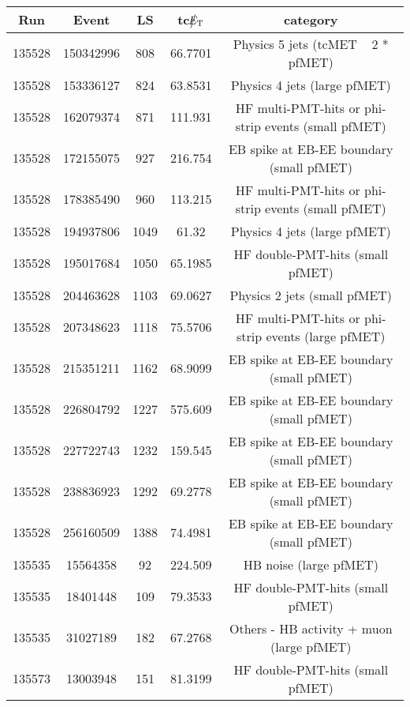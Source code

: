 \begin{table}[htbp]
  \begin{center}
    \begin{tabular}{|c|c|c|c|c|}
      \hline
      Run & Event & LS & tc$\big\slash\hspace{-1.6ex}{E_\text{T}}$ & category \\     
      \hline
      135528  & 150342996    & 808  &    66.7701 & Physics 5 jets (tcMET ~ 2 * pfMET) \\
      135528  & 153336127    & 824  &    63.8531 & Physics 4 jets (large pfMET) \\
      135528  & 162079374    & 871  &    111.931 & HF multi-PMT-hits or phi-strip events (small pfMET) \\
      135528  & 172155075    & 927  &    216.754 & EB spike at EB-EE boundary (small pfMET) \\
      135528  & 178385490    & 960  &    113.215 & HF multi-PMT-hits or phi-strip events (small pfMET) \\
      135528  & 194937806    & 1049 &    61.32   & Physics 4 jets (large pfMET) \\
      135528  & 195017684    & 1050 &    65.1985 & HF double-PMT-hits (small pfMET) \\
      135528  & 204463628    & 1103 &    69.0627 & Physics 2 jets (small pfMET) \\
      135528  & 207348623    & 1118 &    75.5706 & HF multi-PMT-hits or phi-strip events (large pfMET) \\ 
      135528  & 215351211    & 1162 &    68.9099 & EB spike at EB-EE boundary (small pfMET) \\
      135528  & 226804792    & 1227 &    575.609 & EB spike at EB-EE boundary (small pfMET) \\
      135528  & 227722743    & 1232 &    159.545 & EB spike at EB-EE boundary (small pfMET) \\
      135528  & 238836923    & 1292 &    69.2778 & EB spike at EB-EE boundary (small pfMET) \\
      135528  & 256160509    & 1388 &    74.4981 & EB spike at EB-EE boundary (small pfMET) \\
      135535  & 15564358     & 92   &    224.509 & HB noise (large pfMET) \\
      135535  & 18401448     & 109  &    79.3533 & HF double-PMT-hits (small pfMET) \\
      135535  & 31027189     & 182  &    67.2768 & Others - HB activity + muon (large pfMET) \\
      135573  & 13003948     & 151  &    81.3199 & HF double-PMT-hits (small pfMET) \\

\end{tabular}
\end{center}
\end{table}
